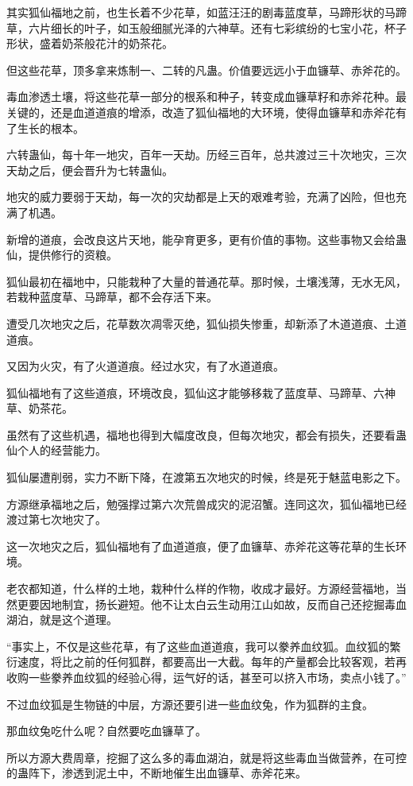 \begin{this_body}
其实狐仙福地之前，也生长着不少花草，如蓝汪汪的剧毒蓝度草，马蹄形状的马蹄草，六片细长的叶子，如玉般细腻光泽的六神草。还有七彩缤纷的七宝小花，杯子形状，盛着奶茶般花汁的奶茶花。

但这些花草，顶多拿来炼制一、二转的凡蛊。价值要远远小于血镰草、赤斧花的。

毒血渗透土壤，将这些花草一部分的根系和种子，转变成血镰草籽和赤斧花种。最关键的，还是血道道痕的增添，改造了狐仙福地的大环境，使得血镰草和赤斧花有了生长的根本。

六转蛊仙，每十年一地灾，百年一天劫。历经三百年，总共渡过三十次地灾，三次天劫之后，便会晋升为七转蛊仙。

地灾的威力要弱于天劫，每一次的灾劫都是上天的艰难考验，充满了凶险，但也充满了机遇。

新增的道痕，会改良这片天地，能孕育更多，更有价值的事物。这些事物又会给蛊仙，提供修行的资粮。

狐仙最初在福地中，只能栽种了大量的普通花草。那时候，土壤浅薄，无水无风，若栽种蓝度草、马蹄草，都不会存活下来。

遭受几次地灾之后，花草数次凋零灭绝，狐仙损失惨重，却新添了木道道痕、土道道痕。

又因为火灾，有了火道道痕。经过水灾，有了水道道痕。

狐仙福地有了这些道痕，环境改良，狐仙这才能够移栽了蓝度草、马蹄草、六神草、奶茶花。

虽然有了这些机遇，福地也得到大幅度改良，但每次地灾，都会有损失，还要看蛊仙个人的经营能力。

狐仙屡遭削弱，实力不断下降，在渡第五次地灾的时候，终是死于魅蓝电影之下。

方源继承福地之后，勉强撑过第六次荒兽成灾的泥沼蟹。连同这次，狐仙福地已经渡过第七次地灾了。

这一次地灾之后，狐仙福地有了血道道痕，便了血镰草、赤斧花这等花草的生长环境。

老农都知道，什么样的土地，栽种什么样的作物，收成才最好。方源经营福地，当然更要因地制宜，扬长避短。他不让太白云生动用江山如故，反而自己还挖掘毒血湖泊，就是这个道理。

“事实上，不仅是这些花草，有了这些血道道痕，我可以豢养血纹狐。血纹狐的繁衍速度，将比之前的任何狐群，都要高出一大截。每年的产量都会比较客观，若再收购一些豢养血纹狐的经验心得，运气好的话，甚至可以挤入市场，卖点小钱了。”

不过血纹狐是生物链的中层，方源还要引进一些血纹兔，作为狐群的主食。

那血纹兔吃什么呢？自然要吃血镰草了。

所以方源大费周章，挖掘了这么多的毒血湖泊，就是将这些毒血当做营养，在可控的蛊阵下，渗透到泥土中，不断地催生出血镰草、赤斧花来。


\end{this_body}
